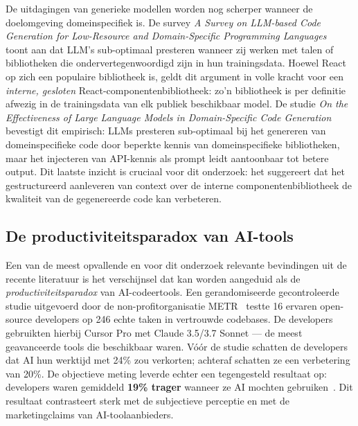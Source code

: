 De uitdagingen van generieke modellen worden nog scherper wanneer de doelomgeving domeinspecifiek is. De survey \textit{A Survey on LLM-based Code Generation for Low-Resource and Domain-Specific Programming Languages}~\autocite{Joel2024} toont aan dat LLM's sub-optimaal presteren wanneer zij werken met talen of bibliotheken die ondervertegenwoordigd zijn in hun trainingsdata. Hoewel React op zich een populaire bibliotheek is, geldt dit argument in volle kracht voor een \textit{interne, gesloten} React-componentenbibliotheek: zo'n bibliotheek is per definitie afwezig in de trainingsdata van elk publiek beschikbaar model. De studie \textit{On the Effectiveness of Large Language Models in Domain-Specific Code Generation}~\autocite{Chen2023} bevestigt dit empirisch: LLMs presteren sub-optimaal bij het genereren van domeinspecifieke code door beperkte kennis van domeinspecifieke bibliotheken, maar het injecteren van API-kennis als prompt leidt aantoonbaar tot betere output. Dit laatste inzicht is cruciaal voor dit onderzoek: het suggereert dat het gestructureerd aanleveren van context over de interne componentenbibliotheek de kwaliteit van de gegenereerde code kan verbeteren.

\subsection{De productiviteitsparadox van AI-tools}
\label{subsec:productiviteitsparadox}

Een van de meest opvallende en voor dit onderzoek relevante bevindingen uit de recente literatuur is het verschijnsel dat kan worden aangeduid als de \textit{productiviteitsparadox} van AI-codeertools. Een gerandomiseerde gecontroleerde studie uitgevoerd door de non-profitorganisatie METR~\autocite{Becker2025} testte 16 ervaren open-source developers op 246 echte taken in vertrouwde codebases. De developers gebruikten hierbij Cursor Pro met Claude 3.5/3.7 Sonnet --- de meest geavanceerde tools die beschikbaar waren. Vóór de studie schatten de developers dat AI hun werktijd met 24\% zou verkorten; achteraf schatten ze een verbetering van 20\%. De objectieve meting leverde echter een tegengesteld resultaat op: developers waren gemiddeld \textbf{19\% trager} wanneer ze AI mochten gebruiken~\autocite{Becker2025}. Dit resultaat contrasteert sterk met de subjectieve perceptie en met de marketingclaims van AI-toolaanbieders.

